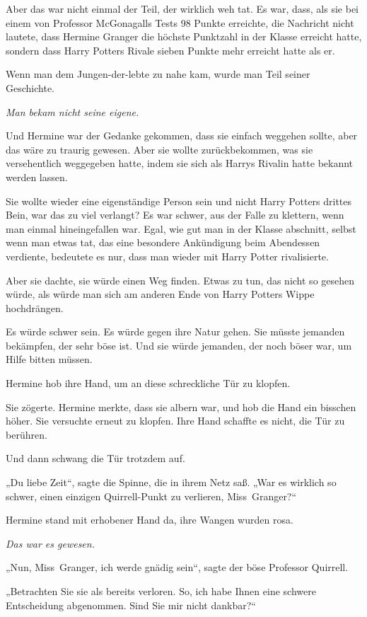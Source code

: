 {Aber das war nicht einmal der Teil, der wirklich weh tat. Es war, dass, als sie bei einem von Professor McGonagalls Tests 98 Punkte erreichte, die Nachricht nicht lautete, dass Hermine Granger die höchste Punktzahl in der Klasse erreicht hatte, sondern dass Harry Potters Rivale sieben Punkte mehr erreicht hatte als er.

Wenn man dem Jungen-der-lebte zu nahe kam, wurde man Teil seiner Geschichte.

\emph{Man bekam nicht seine eigene.}

Und Hermine war der Gedanke gekommen, dass sie einfach weggehen sollte, aber das wäre zu traurig gewesen. Aber sie wollte zurückbekommen, was sie versehentlich weggegeben hatte, indem sie sich als Harrys Rivalin hatte bekannt werden lassen.

Sie wollte wieder eine eigenständige Person sein und nicht Harry Potters drittes Bein, war das zu viel verlangt? Es war schwer, aus der Falle zu klettern, wenn man einmal hineingefallen war. Egal, wie gut man in der Klasse abschnitt, selbst wenn man etwas tat, das eine besondere Ankündigung beim Abendessen verdiente, bedeutete es nur, dass man wieder mit Harry Potter rivalisierte.

Aber sie dachte, sie würde einen Weg finden. Etwas zu tun, das nicht so gesehen würde, als würde man sich am anderen Ende von Harry Potters Wippe hochdrängen.

Es würde schwer sein. Es würde gegen ihre Natur gehen. Sie müsste jemanden bekämpfen, der sehr böse ist. Und sie würde jemanden, der noch böser war, um Hilfe bitten müssen.

Hermine hob ihre Hand, um an diese schreckliche Tür zu klopfen.

Sie zögerte. Hermine merkte, dass sie albern war, und hob die Hand ein bisschen höher. Sie versuchte erneut zu klopfen. Ihre Hand schaffte es nicht, die Tür zu berühren.

Und dann schwang die Tür trotzdem auf.

„Du liebe Zeit“, sagte die Spinne, die in ihrem Netz saß. „War es wirklich so schwer, einen einzigen Quirrell-Punkt zu verlieren, Miss~Granger?“

Hermine stand mit erhobener Hand da, ihre Wangen wurden rosa.

\emph{Das war es gewesen.}

„Nun, Miss~Granger, ich werde gnädig sein“, sagte der böse Professor Quirrell.

„Betrachten Sie sie als bereits verloren. So, ich habe Ihnen eine schwere Entscheidung abgenommen. Sind Sie mir nicht dankbar?“

}
